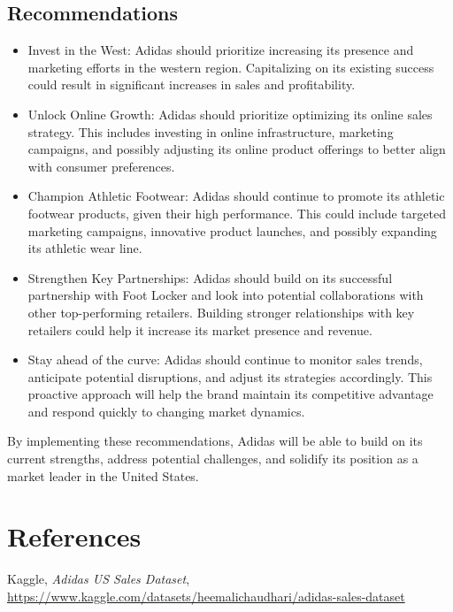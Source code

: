 \documentclass{article}\usepackage[]{graphicx}\usepackage[]{xcolor}
\begin{document}
\subsection{Recommendations}
  \begin{itemize}
\item Invest in the West: Adidas should prioritize increasing its presence and marketing efforts in the western region. Capitalizing on its existing success could result in significant increases in sales and profitability.

\item Unlock Online Growth: Adidas should prioritize optimizing its online sales strategy. This includes investing in online infrastructure, marketing campaigns, and possibly adjusting its online product offerings to better align with consumer preferences.

\item Champion Athletic Footwear: Adidas should continue to promote its athletic footwear products, given their high performance. This could include targeted marketing campaigns, innovative product launches, and possibly expanding its athletic wear line.

\item Strengthen Key Partnerships: Adidas should build on its successful partnership with Foot Locker and look into potential collaborations with other top-performing retailers. Building stronger relationships with key retailers could help it increase its market presence and revenue.

\item Stay ahead of the curve: Adidas should continue to monitor sales trends, anticipate potential disruptions, and adjust its strategies accordingly. This proactive approach will help the brand maintain its competitive advantage and respond quickly to changing market dynamics.

\end{itemize}

By implementing these recommendations, Adidas will be able to build on its current strengths, address potential challenges, and solidify its position as a market leader in the United States.

\newpage

\section{References}

\begin{thebibliography}{9}
Kaggle, \textit{Adidas US Sales Dataset}, \url{https://www.kaggle.com/datasets/heemalichaudhari/adidas-sales-dataset}
\end{thebibliography}
\end{document}
